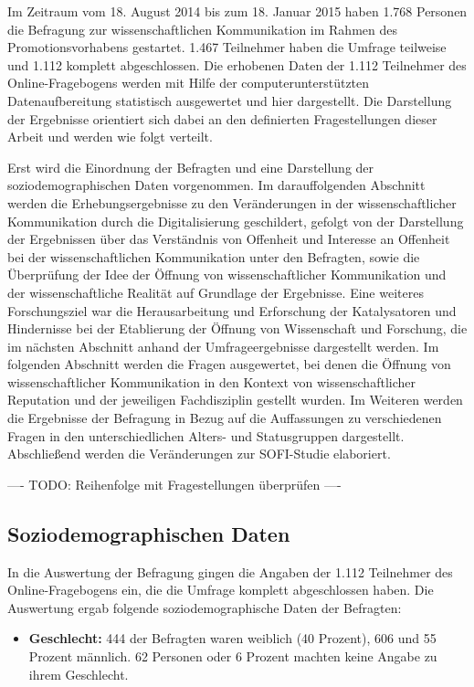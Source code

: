 Im Zeitraum vom 18. August 2014 bis zum 18. Januar 2015 haben 1.768 Personen die Befragung zur wissenschaftlichen Kommunikation im Rahmen des Promotionsvorhabens gestartet. 1.467 Teilnehmer haben die Umfrage teilweise und 1.112 komplett abgeschlossen. Die erhobenen Daten der 1.112 Teilnehmer des Online-Fragebogens werden mit Hilfe der computerunterstützten Datenaufbereitung statistisch ausgewertet und hier dargestellt. Die Darstellung der Ergebnisse orientiert sich dabei an den definierten Fragestellungen dieser Arbeit und werden wie folgt verteilt.

Erst wird die Einordnung der Befragten und eine Darstellung der soziodemographischen Daten vorgenommen. Im darauffolgenden Abschnitt werden die Erhebungsergebnisse zu den Veränderungen in der wissenschaftlicher Kommunikation durch die Digitalisierung geschildert, gefolgt von der Darstellung der Ergebnissen über das Verständnis von Offenheit und Interesse an Offenheit bei der wissenschaftlichen Kommunikation unter den Befragten, sowie die Überprüfung der Idee der Öffnung von wissenschaftlicher Kommunikation und der wissenschaftliche Realität auf Grundlage der Ergebnisse. Eine weiteres Forschungsziel war die Herausarbeitung und Erforschung der Katalysatoren und Hindernisse bei der Etablierung der Öffnung von Wissenschaft und Forschung, die im nächsten Abschnitt anhand der Umfrageergebnisse dargestellt werden. Im folgenden Abschnitt werden die Fragen ausgewertet, bei denen die Öffnung von wissenschaftlicher Kommunikation in den Kontext von wissenschaftlicher Reputation und der jeweiligen Fachdisziplin gestellt wurden. Im Weiteren werden die Ergebnisse der Befragung in Bezug auf die Auffassungen zu verschiedenen Fragen in den unterschiedlichen Alters- und Statusgruppen dargestellt. Abschließend werden die Veränderungen zur SOFI-Studie elaboriert.

---- TODO: Reihenfolge mit Fragestellungen überprüfen ----

\subsection{Soziodemographischen Daten}

In die Auswertung der Befragung gingen die Angaben der 1.112 Teilnehmer des Online-Fragebogens ein, die die Umfrage komplett abgeschlossen haben. Die Auswertung ergab folgende soziodemographische Daten der Befragten:

\begin{itemize}
\item \textbf{Geschlecht:} 444 der Befragten waren weiblich (40 Prozent), 606 und 55 Prozent männlich. 62 Personen oder 6 Prozent machten keine Angabe zu ihrem Geschlecht.
\end{itemize}

